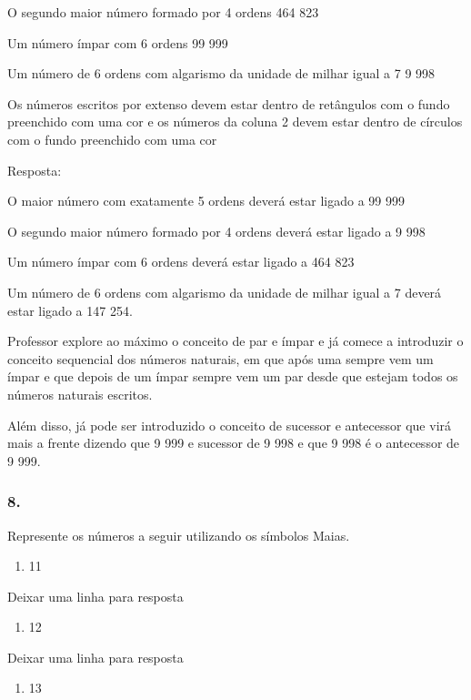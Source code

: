 O segundo maior número formado por 4 ordens 464 823

Um número ímpar com 6 ordens 99 999

Um número de 6 ordens com algarismo da unidade de milhar igual a 7 9 998

Os números escritos por extenso devem estar dentro de retângulos com o
fundo preenchido com uma cor e os números da coluna 2 devem estar dentro
de círculos com o fundo preenchido com uma cor

Resposta:

O maior número com exatamente 5 ordens deverá estar ligado a 99 999

O segundo maior número formado por 4 ordens deverá estar ligado a 9 998

Um número ímpar com 6 ordens deverá estar ligado a 464 823

Um número de 6 ordens com algarismo da unidade de milhar igual a 7
deverá estar ligado a 147 254.

Professor explore ao máximo o conceito de par e ímpar e já comece a
introduzir o conceito sequencial dos números naturais, em que após uma
sempre vem um ímpar e que depois de um ímpar sempre vem um par desde que
estejam todos os números naturais escritos.

Além disso, já pode ser introduzido o conceito de sucessor e antecessor
que virá mais a frente dizendo que 9 999 e sucessor de 9 998 e que 9 998
é o antecessor de 9 999.

\subsubsection{8.}\label{section-7}

Represente os números a seguir utilizando os símbolos Maias.

\begin{enumerate}
\def\labelenumi{\alph{enumi})}
\item
  11
\end{enumerate}

Deixar uma linha para resposta

\begin{enumerate}
\def\labelenumi{\alph{enumi})}
\item
  12
\end{enumerate}

Deixar uma linha para resposta

\begin{enumerate}
\def\labelenumi{\alph{enumi})}
\item
  13
\end{enumerate}

